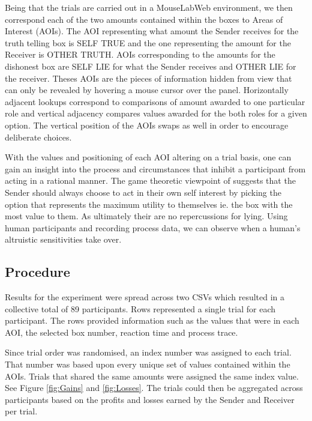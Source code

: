 \documentclass[man, floatsintext]{apa7}
\begin{document}
Being that the trials are carried out in a MouseLabWeb environment, we then correspond each of the two amounts contained within the boxes to Areas of Interest (AOIs). The AOI representing what amount the Sender receives for the truth telling box is SELF TRUE and the one representing the amount for the Receiver is OTHER TRUTH. AOIs corresponding to the amounts for the dishonest box are SELF LIE for what the Sender receives and OTHER LIE for the receiver. Theses AOIs are the pieces of information hidden from view that can only be revealed by hovering a mouse cursor over the panel. Horizontally adjacent lookups correspond to comparisons of amount awarded to one particular role and vertical adjacency compares values awarded for the both roles for a given option. The vertical position of the AOIs swaps as well in order to encourage deliberate choices.

With the values and positioning of each AOI altering on a trial basis, one can gain an insight into the process and circumstances that inhibit a participant from acting in a rational manner. The game theoretic viewpoint of suggests that the Sender should always choose to act in their own self interest by picking the option that represents the maximum utility to themselves ie. the box with the most value to them. As ultimately their are no repercussions for lying. Using human participants and recording process data, we can observe when a human's altruistic sensitivities take over.


\subsection{Procedure}

Results for the experiment were spread across two CSVs which resulted in a collective total of 89 participants. Rows represented a single trial for each participant. The rows provided information such as the values that were in each AOI, the selected box number, reaction time and process trace.

Since trial order was randomised, an index number was assigned to each trial. That number was based upon every unique set of values contained within the AOIs. Trials that shared the same amounts were assigned the same index value. See Figure \ref{fig:Gains} and \ref{fig:Losses}. The trials could then be aggregated across participants based on the profits and losses earned by the Sender and Receiver per trial.
\end{document}
